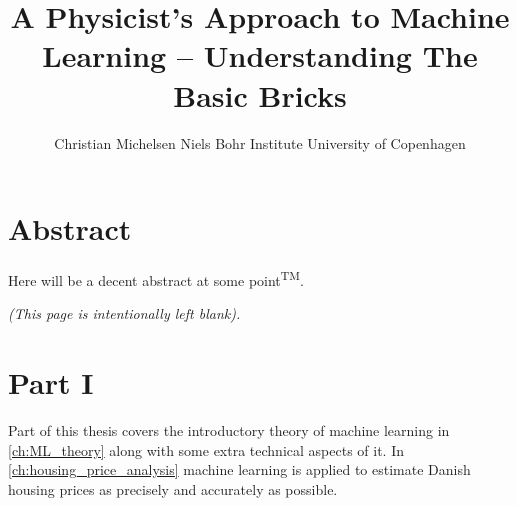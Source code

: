 \documentclass[a4paper, twoside, nobib, justified]{tufte-book} %
\title[A Physicist's Approach To Machine Learning -- Understanding The Basic Bricks]{A Physicist's \newline \noindent 
       Approach to \newline \noindent 
       Machine Learning \newline \noindent
       --  \newline \noindent
       Understanding  \newline \noindent
       The Basic Bricks}
\author[Christian Michelsen]{\newline \noindent 
        Christian Michelsen \newline \noindent 
        Niels Bohr Institute \newline \noindent 
        University of Copenhagen \newline }
\makeatletter
\newcommand{\RNum}[1]{\uppercase\expandafter{\romannumeral #1\relax}}
\newcommand*{\blankpage}{%
\vspace*{\fill}
{\centering \textit{(This page is intentionally left blank).}\par}
\vspace{\fill}}
\renewcommand*{\cleardoublepage}{\clearpage\if@twoside \ifodd\c@page\else
\blankpage
\thispagestyle{empty}
\newpage
\if@twocolumn\hbox{}\newpage\fi\fi\fi}
\makeatother
\begin{document}
\begin{titlepage}
  
\end{titlepage}



\chapter*{Abstract}
Here will be a decent abstract at some point\textsuperscript{TM}.


\cleardoublepage
{}
{}

\tableofcontents





\mainmatter
{}



\chapter*{Part I}
Part \RNum{1} of this thesis covers the introductory theory of machine learning in \autoref{ch:ML_theory} along with some extra technical aspects of it. In \autoref{ch:housing_price_analysis} machine learning is applied to estimate Danish housing prices as precisely and accurately as possible.  




\end{document}
